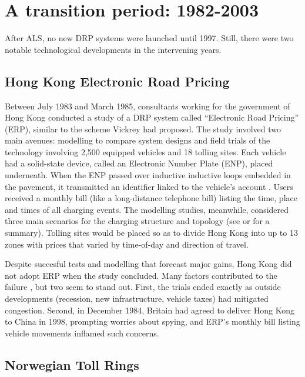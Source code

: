 \section{A transition period: 1982-2003}

After ALS, no new DRP systems were launched until 1997. Still, there were two notable technological developments in the intervening years.

\subsection{Hong Kong Electronic Road Pricing}

 Between July 1983 and March 1985, consultants working for the government of Hong Kong conducted a study of a DRP system called ``Electronic Road Pricing'' (ERP), similar to the scheme Vickrey had proposed. The study involved two main avenues: modelling to compare system designs and field trials of the technology involving 2,500 equipped vehicles and 18 tolling sites\citep{Dawson1986}. Each vehicle had a solid-state device, called an Electronic Number Plate (ENP), placed underneath. When the ENP passed over inductive inductive loops embedded in the pavement, it transmitted an identifier linked to the vehicle's account \citep[pp. 130-131]{Dawson1986}. Users received a monthly bill (like a long-distance telephone bill) listing the time, place and times of all charging events. The modelling studies, meanwhile, considered three main scenarios for the charging structure and topology (see \citet[Table 11, p. 23]{Gomez-Ibanez1994} or \citet[Table 10.3, p. 218]{Small1998} for a summary). Tolling sites would be placed so as to divide Hong Kong into up to 13 zones with prices that varied by time-of-day and direction of travel.
 
 Despite succesful tests and modelling that forecast major gains, Hong Kong did not adopt ERP when the study concluded. Many factors contributed to the failure \citep{Hau1990,Borins1988}, but two seem to stand out. First, the trials ended exactly as outside developments (recession, new infrastructure, vehicle taxes) had mitigated congestion. Second, in December 1984, Britain had agreed to deliver Hong Kong to China in 1998, prompting worries about spying, and ERP's monthly bill listing vehicle movements inflamed such concerns.

\subsection{Norwegian Toll Rings}

